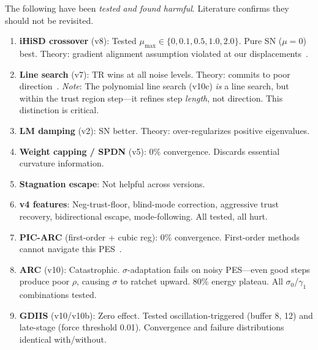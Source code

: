 \documentclass[11pt,a4paper]{article}
\theoremstyle{definition}
\begin{document}
The following have been \emph{tested and found harmful}.  Literature confirms
they should not be revisited.

\begin{enumerate}[nosep]
  \item \textbf{iHiSD crossover} (v8): Tested $\mu_\text{max} \in \{0, 0.1,
    0.5, 1.0, 2.0\}$.  Pure SN ($\mu=0$) best.  Theory: gradient alignment
    assumption violated at our displacements~\citep{ihisd}.

  \item \textbf{Line search} (v7): TR wins at all noise levels.  Theory:
    commits to poor direction~\citep{schlegel2011}.
    \emph{Note}: The polynomial line search (v10c) \emph{is} a line search,
    but within the trust region step---it refines step \emph{length}, not
    direction.  This distinction is critical.

  \item \textbf{LM damping} (v2): SN better.  Theory: over-regularizes
    positive eigenvalues.

  \item \textbf{Weight capping / SPDN} (v5): 0\% convergence.  Discards
    essential curvature information.

  \item \textbf{Stagnation escape}: Not helpful across versions.

  \item \textbf{v4 features}: Neg-trust-floor, blind-mode correction,
    aggressive trust recovery, bidirectional escape, mode-following.
    All tested, all hurt.

  \item \textbf{PIC-ARC} (first-order + cubic reg): 0\% convergence.
    First-order methods cannot navigate this PES~\citep{packwood2018}.

  \item \textbf{ARC} (v10): Catastrophic.  $\sigma$-adaptation fails on
    noisy PES---even good steps produce poor $\rho$, causing $\sigma$ to
    ratchet upward.  80\% energy plateau.  All $\sigma_0$/$\gamma_1$
    combinations tested.

  \item \textbf{GDIIS} (v10/v10b): Zero effect.  Tested oscillation-triggered
    (buffer 8, 12) and late-stage (force threshold 0.01).  Convergence and
    failure distributions identical with/without.
\end{enumerate}

\end{document}
